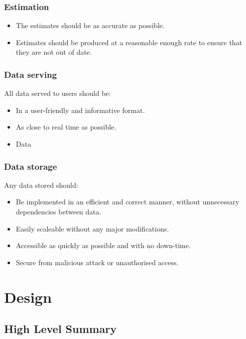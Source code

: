 \documentclass{l4proj}
\begin{document}
\subsection{Estimation}
\begin{itemize}	
  \item The estimates should be as accurate as possible.
  \item Estimates should be produced at a reasonable enough rate to ensure that they are not out of date.
\end{itemize}

\subsection{Data serving}
All data served to users should be:
\begin{itemize}	
  \item In a user-friendly and informative format.
  \item As close to real time as possible.
  \item Data 

\end{itemize}

\subsection{Data storage}
Any data stored should:
\begin{itemize}	
  \item Be implemented in an efficient and correct manner, without unnecessary dependencies between data.
  \item Easily scaleable without any major modifications.
  \item Accessible as quickly as possible and with no down-time.
  \item Secure from malicious attack or unauthorised access.
\end{itemize}



\chapter{Design}
\section{High Level Summary}
\end{document}
